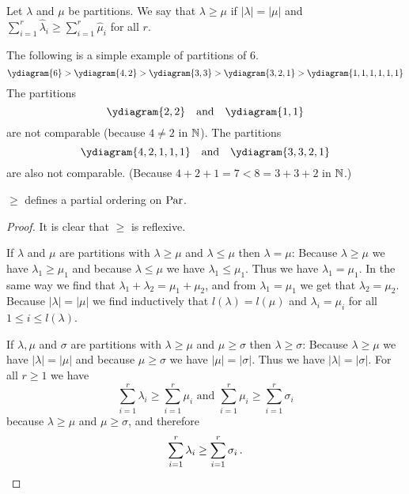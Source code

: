 \begin{definition}
  Let $\lambda$ and $\mu$ be partitions.
  We say that $\lambda \geq \mu$ if $|\lambda| = |\mu|$ and $\sum_{i=1}^r \hat{\lambda}_i \geq \sum_{i=1}^r \hat{\mu}_i$ for all $r$.
\end{definition}


\begin{example}
  The following is a simple example of partitions of $6$.
  \[
      \ydiagram{6}
    > \ydiagram{4,2}
    > \ydiagram{3,3}
    > \ydiagram{3,2,1}
    > \ydiagram{1,1,1,1,1,1}
  \]
  The partitions
  \[
    \ydiagram{2,2}
    \quad \text{and} \quad
    \ydiagram{1,1}
  \]
  are not comparable (because $4 \neq 2$ in $\mathbb{N}$). The partitions
  \[
    \ydiagram{4,2,1,1,1}
    \quad \text{and} \quad
    \ydiagram{3,3,2,1}
  \]
  are also not comparable.
  (Because $4+2+1 = 7 < 8 = 3+3+2$ in $\mathbb{N}$.)
\end{example}

\begin{lemma}
  $\geq$ defines a partial ordering on $\operatorname{Par}$.
\end{lemma}
\begin{proof}
  It is clear that $\geq$ is reflexive.
  
  If $\lambda$ and $\mu$ are partitions with $\lambda \geq \mu$ and $\lambda \leq \mu$ then $\lambda = \mu$:
  Because $\lambda \geq \mu$ we have $\lambda_1 \geq \mu_1$ and because $\lambda \leq \mu$ we have $\lambda_1 \leq \mu_1$.
  Thus we have $\lambda_1 = \mu_1$.
  In the same way we find that $\lambda_1 + \lambda_2 = \mu_1 + \mu_2$, and from $\lambda_1 = \mu_1$ we get that $\lambda_2 = \mu_2$.
  Because $|\lambda| = |\mu|$ we find inductively that $l(\lambda) = l(\mu)$ and $\lambda_i = \mu_i$ for all $1 \leq i \leq l(\lambda)$.
  
  If $\lambda, \mu$ and $\sigma$ are partitions with $\lambda \geq \mu$ and $\mu \geq \sigma$ then $\lambda \geq \sigma$:
  Because $\lambda \geq \mu$ we have $|\lambda| = |\mu|$ and because $\mu \geq \sigma$ we have $|\mu| = |\sigma|$.
  Thus we have $|\lambda| = |\sigma|$.
  For all $r \geq 1$ we have
  \[
          \sum_{i=1}^r \lambda_i
    \geq  \sum_{i=1}^r \mu_i
    \text{ and }
          \sum_{i=1}^r \mu_i
    \geq  \sum_{i=1}^r \sigma_i
  \]
  because $\lambda \geq \mu$ and $\mu \geq \sigma$, and therefore
  \[
          \sum_{i=1}^r \lambda_i
    \geq  \sum_{i=1}^r \sigma_i \,.
    \qedhere
  \]
\end{proof}


